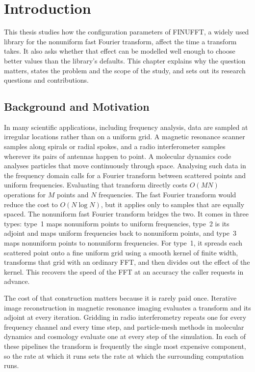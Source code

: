 \chapter{Introduction}
\label{ch:introduction}

This thesis studies how the configuration parameters of FINUFFT, a widely used
library for the nonuniform fast Fourier transform, affect the time a transform
takes. It also asks whether that effect can be modelled well enough to choose
better values than the library's defaults. This chapter explains why the
question matters, states the problem and the scope of the study, and sets out
its research questions and contributions.

\section{Background and Motivation}

In many scientific applications, including frequency analysis, data are sampled
at irregular locations rather than on a uniform grid. A magnetic resonance
scanner samples along spirals or radial spokes, and a radio interferometer
samples wherever its pairs of antennas happen to point. A molecular dynamics
code analyses particles that move continuously through space. Analysing such
data in the frequency domain calls for a Fourier transform between scattered
points and uniform frequencies. Evaluating that transform directly costs
$O(MN)$ operations for $M$ points and $N$ frequencies. The fast Fourier
transform would reduce the cost to $O(N \log N)$, but it applies only to
samples that are equally spaced. The nonuniform fast Fourier transform bridges
the two. It comes in three types: type~1 maps nonuniform points to uniform
frequencies, type~2 is its adjoint and maps uniform frequencies back to
nonuniform points, and type~3 maps nonuniform points to nonuniform
frequencies. For type~1, it spreads each scattered point onto a fine uniform grid using a
smooth kernel of finite width, transforms that grid with an ordinary FFT, and
then divides out the effect of the kernel. This recovers the speed of the FFT
at an accuracy the caller requests in advance.

The cost of that construction matters because it is rarely paid once. Iterative
image reconstruction in magnetic resonance imaging evaluates a transform and its
adjoint at every iteration. Gridding in radio interferometry repeats one for
every frequency channel and every time step, and particle-mesh methods in
molecular dynamics and cosmology evaluate one at every step of the simulation.
In each of these pipelines the transform is frequently the single most
expensive component, so the rate at which it runs sets the rate at which the
surrounding computation runs.

